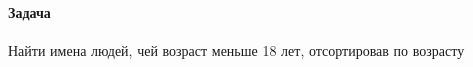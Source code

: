 \begin{frame}
	\frametitle{\insertsection} 
	\framesubtitle{Задача}
	Найти имена людей, чей возраст меньше 18 лет, отсортировав по возрасту
\end{frame}